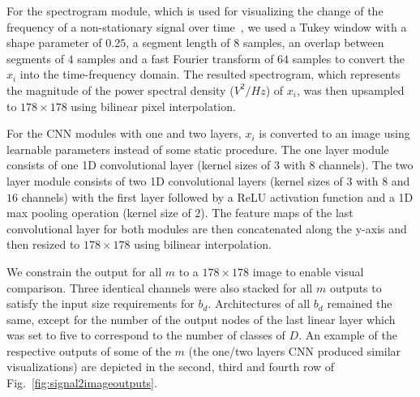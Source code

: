 \documentclass[conference]{IEEEtran}
\begin{document}
For the spectrogram module, which is used for visualizing the change
of the frequency of a non-stationary signal over
time~\cite{oppenheim1999discrete}, we used a Tukey window with a
shape parameter of $0.25$, a segment length of $8$ samples, an
overlap between segments of $4$ samples and a fast Fourier transform
of $64$ samples to convert the $x_i$ into the time-frequency domain.
The resulted spectrogram, which represents the magnitude of the power
spectral density ($V^2/Hz$) of $x_i$, was then upsampled to
$178\times 178$ using bilinear pixel interpolation.

For the CNN modules with one and two layers, $x_i$ is converted to an
image using learnable parameters instead of some static procedure.
The one layer module consists of one 1D convolutional layer (kernel
sizes of $3$ with $8$ channels).
The two layer module consists of two 1D convolutional layers (kernel
sizes of $3$ with $8$ and $16$ channels) with the first layer
followed by a ReLU activation function and a 1D max pooling operation
(kernel size of $2$).
The feature maps of the last convolutional layer for both modules are
then concatenated along the y-axis and then resized to $178\times
178$ using bilinear interpolation.

We constrain the output for all $m$ to a $178\times 178$ image to
enable visual comparison.
Three identical channels were also stacked for all $m$ outputs to
satisfy the input size requirements for $b_d$.
Architectures of all $b_d$ remained the same, except for the number
of the output nodes of the last linear layer which was set to five to
correspond to the number of classes of $D$.
An example of the respective outputs of some of the $m$ (the one/two
layers CNN produced similar visualizations) are depicted in the
second, third and fourth row of Fig.~\ref{fig:signal2imageoutputs}.
\end{document}
